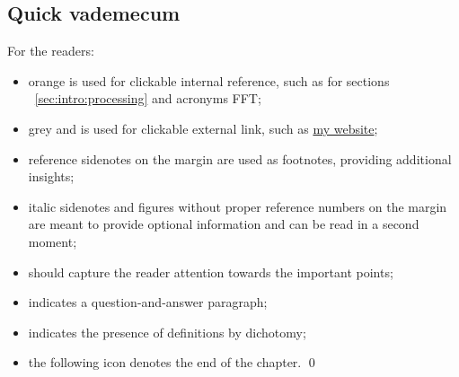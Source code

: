 \subsection{Quick vademecum}
For the readers:
\begin{itemize}
    \item \textcolor{myorange}{orange} is used for clickable internal reference, such as for sections ~\cref{sec:intro:processing} and acronyms \acs{FFT};
    \item \textcolor{mygray}{grey} and \ExternalLink is used for clickable external link, such as \href{www.diegodicarlo.com}{my website\ExternalLink};
    \item reference sidenotes on the margin are used as footnotes, providing additional insights;
    \item italic sidenotes and figures without proper reference numbers on the margin are meant to provide optional information and can be read in a second moment;
    \item \textcolor{black!30}{\scriptsize\raisebox{1pt}{$\blacktriangleright$}}\hspace{0.2em}should capture the reader attention towards the important points;
    \item \textcolor{black!30}{\scriptsize{}}\hspace{0.2em}indicates a question-and-answer paragraph;
    \item \textcolor{black!30}{\scriptsize\raisebox{1pt}{$\rightleftarrows$}}\hspace{0.2em}indicates the presence of definitions by dichotomy;
    \item the following icon denotes the end of the chapter. \qed
\end{itemize}


